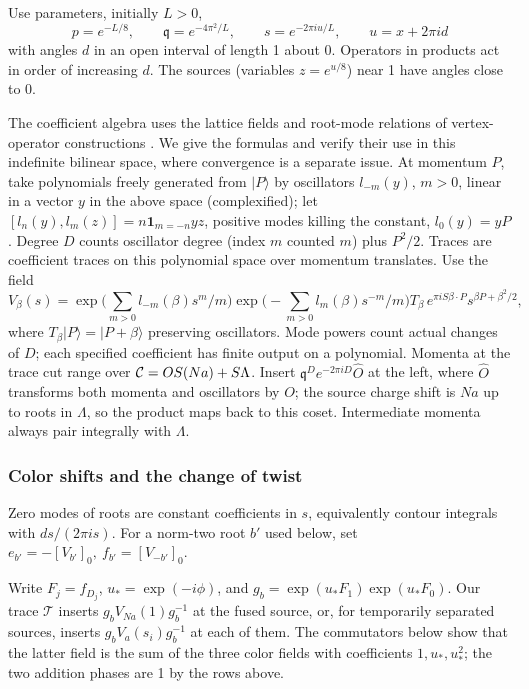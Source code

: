 Use parameters, initially \(L>0\),
\[
 p=e^{-L/8},\qquad \mathfrak q=e^{-4\pi^2/L},\qquad s=e^{-2\pi i u/L},\qquad u=x+2\pi i d
\]
with angles \(d\) in an open interval of length 1 about 0. Operators in products act in order of increasing \(d\). The sources (variables \(z=e^{u/8}\)) near 1 have angles close to 0.

The coefficient algebra uses the lattice fields and root-mode relations of vertex-operator constructions \cite[Section~2.1, equations~(2.2)--(2.5)]{Frenkel1985}. We give the formulas and verify their use in this indefinite bilinear space, where convergence is a separate issue. At momentum \(P\), take polynomials freely generated from \(|P\rangle\) by oscillators \(l_{-m}(y)\), \(m>0\), linear in a vector \(y\) in the above space (complexified); let
\([l_n(y),l_m(z)]=n\mathbf1_{m=-n} y z\), positive modes killing the constant, \(l_0(y)=yP\). Degree \(D\) counts oscillator degree (index \(m\) counted \(m\)) plus \(P^2/2\). Traces are coefficient traces on this polynomial space over momentum translates. Use the field
\[
 V_\beta(s)=
 \exp\Big(\sum_{m>0} l_{-m}(\beta)s^m/m\Big)
 \exp\Big(-\sum_{m>0} l_m(\beta)s^{-m}/m\Big)
 T_\beta\, e^{\pi i S\beta\cdot P}s^{\beta P+\beta^2/2},
\]
where \(T_\beta|P\rangle=|P+\beta\rangle\) preserving oscillators. Mode powers count actual changes of \(D\); each specified coefficient has finite output on a polynomial. Momenta at the trace cut range over \({\cal C}=OS(Na)+S\Lambda\). Insert \(\mathfrak q^D e^{-2\pi iD}\widehat O\) at the left, where \(\widehat O\) transforms both momenta and oscillators by \(O\); the source charge shift is \(Na\) up to roots in \(\Lambda\), so the product maps back to this coset. Intermediate momenta always pair integrally with \(\Lambda\).

\subsubsection*{Color shifts and the change of twist}

Zero modes of roots are constant coefficients in \(s\), equivalently contour integrals with \(ds/(2\pi i s)\). For a norm-two root \(b'\) used below, set \(e_{b'}=-[V_{b'}]_0,\ f_{b'}=[V_{-b'}]_0\).

Write \(F_j=f_{D_j}\), \(u_*=\exp(-i\phi)\), and \(g_b=\exp(u_*F_1)\exp(u_*F_0)\).
Our trace \(\mathcal T\) inserts \(g_b V_{Na}(1) g_b^{-1}\) at the fused source, or, for temporarily separated sources, inserts \(g_b V_a(s_i)g_b^{-1}\) at each of them. The commutators below show that the latter field is the sum of the three color fields with coefficients \(1,u_*,u_*^2\); the two addition phases are 1 by the rows above.

